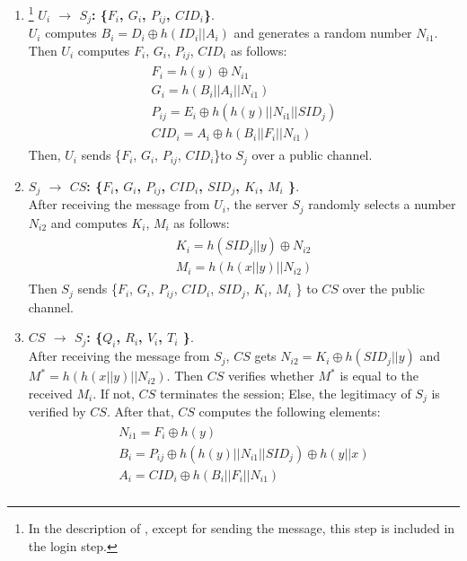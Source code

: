 \documentclass[preprint,12pt]{elsarticle}
\begin{document}
\begin{enumerate}[Step 1:]
\item\footnote{In the description of \cite{passwd-based-multi7}, except for sending the message, this step is included in the login step.} \textbf{$U_i$ $\rightarrow$ $S_j$: \{$F_i$, $G_i$, $P_{ij}$, $CID_i$\}}.\\
$U_i$ computes $B_i=D_i\oplus h(ID_i||A_i)$ and generates a random number $N_{i1}$. Then $U_i$ computes  $F_i$, $G_i$, $P_{ij}$, $CID_i$ as follows:
\begin{eqnarray}
\left.\begin{array}{l}
F_i=h(y)\oplus N_{i1}\\
G_i=h(B_i||A_i||N_{i1})\\
P_{ij}=E_i\oplus h(h(y)||N_{i1}||SID_j)\\
CID_i=A_i\oplus h(B_i||F_i||N_{i1})
\end{array} \right.
\end{eqnarray}
Then, $U_i$ sends \{$F_i$, $G_i$, $P_{ij}$, $CID_i$\}to $S_j$ over a public channel.
\item \textbf{$S_j$ $\rightarrow$ $CS$: \{$F_i$, $G_i$, $P_{ij}$, $CID_i$, $SID_j$, $K_i$, $M_i$ \}}.\\
After receiving the message from $U_i$, the server $S_j$ randomly selects a number $N_{i2}$ and computes $K_i$, $M_i$ as follows:
\begin{eqnarray}
\left.\begin{array}{l}
K_i=h(SID_j||y)\oplus N_{i2}\\
M_i=h(h(x||y)||N_{i2})
\end{array} \right.
\end{eqnarray}
Then $S_j$ sends \{$F_i$, $G_i$, $P_{ij}$, $CID_i$, $SID_j$, $K_i$, $M_i$ \} to $CS$ over the public channel.
\item \textbf{$CS$ $\rightarrow$ $S_j$: \{$Q_i$, $R_i$, $V_i$, $T_i$ \}}.\\
After receiving the message from $S_j$, $CS$ gets $N_{i2}=K_i\oplus h(SID_j||y)$ and $M^*=h(h(x||y)||N_{i2})$. Then $CS$ verifies whether $M^*$ is equal to the received $M_i$. If not, $CS$ terminates the session; Else, the legitimacy of $S_j$ is verified by $CS$. After that, $CS$ computes the following elements:
\begin{eqnarray}
\left.\begin{array}{l}
N_{i1}=F_i\oplus h(y)\\
B_i=P_{ij}\oplus h(h(y)||N_{i1}||SID_j)\oplus h(y||x)\\
A_i=CID_i\oplus h(B_i||F_i||N_{i1})\\

\end{array}
\end{eqnarray}
\end{enumerate}
\end{document}
